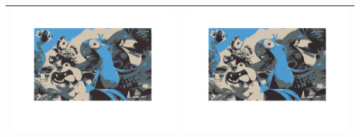 \documentclass[fleqn]{article}
\begin{document}
\begin{center}
\begin{longtable}{ c | c }
	\includegraphics[scale=0.4]{./pics/task1and2/rio_k=4_random/K=4_iteration_5_random_4_rio.png} & \includegraphics[scale=0.4]{./pics/task1and2/rio_k=4_random/K=4_iteration_6_random_4_rio.png} \\\hline

\end{longtable}
\end{center}
\end{document}
